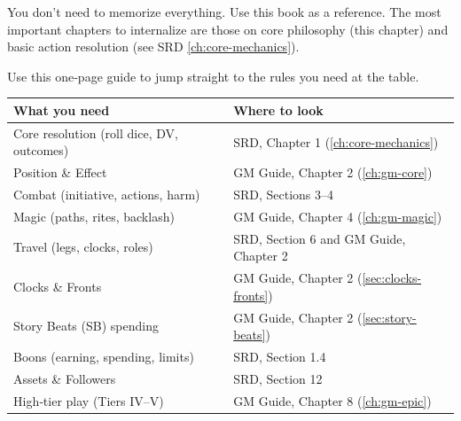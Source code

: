 You don’t need to memorize everything. Use this book as a reference. The most important chapters to internalize are those on core philosophy (this chapter) and basic action resolution (see SRD \ref{ch:core-mechanics}).

\begin{tcolorbox}[enhanced, sharp corners, boxrule=1pt, colback=gray!5!white, colframe=gray!75!black, title={Quick Reference: Where to Find It}]
Use this one‑page guide to jump straight to the rules you need at the table.

\begin{center}
\begin{tabular}{|p{5cm}|p{7cm}|}
\hline
\textbf{What you need} & \textbf{Where to look} \\
\hline
Core resolution (roll dice, DV, outcomes) & SRD, Chapter 1 (\ref{ch:core-mechanics}) \\
\hline
Position \& Effect & GM Guide, Chapter 2 (\ref{ch:gm-core}) \\
\hline
Combat (initiative, actions, harm) & SRD, Sections 3–4 \\
\hline
Magic (paths, rites, backlash) & GM Guide, Chapter 4 (\ref{ch:gm-magic}) \\
\hline
Travel (legs, clocks, roles) & SRD, Section 6 and GM Guide, Chapter 2 \\
\hline
Clocks \& Fronts & GM Guide, Chapter 2 (\ref{sec:clocks-fronts}) \\
\hline
Story Beats (SB) spending & GM Guide, Chapter 2 (\ref{sec:story-beats}) \\
\hline
Boons (earning, spending, limits) & SRD, Section 1.4 \\
\hline
Assets \& Followers & SRD, Section 12 \\
\hline
High‑tier play (Tiers IV–V) & GM Guide, Chapter 8 (\ref{ch:gm-epic}) \\
\hline
\end{tabular}
\end{center}
\end{tcolorbox}

